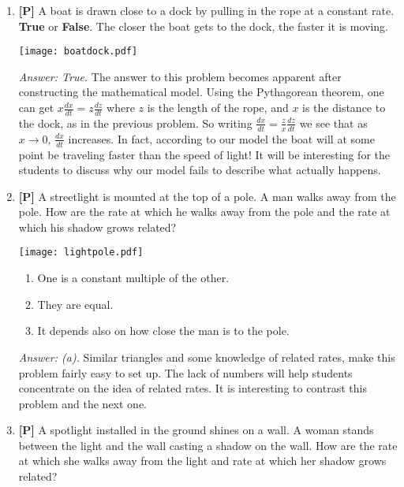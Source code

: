 \documentclass[12pt]{article}
\begin{document}
\begin{enumerate}
Note that answer (a) is correct in the case the boat is pulled in
from a floating dock.

\bigskip

\item {\bf [P]}
A boat is drawn close to a dock by pulling in the rope at a
constant rate.  {\bf True} or {\bf False}. The closer the boat
gets to the dock, the faster it is moving.

\begin{center}
\texttt{[image: boatdock.pdf]}
\end{center}

{\it Answer: True.} The answer to this problem becomes apparent
after constructing the mathematical model. Using the Pythagorean
theorem, one can get $x\frac{dx}{dt}=z\frac{dz}{dt}$ where $z$ 
is the length of the
rope, and $x$ is the distance to the dock, as in the previous problem. So writing
$\frac{dx}{dt}=\frac{z}{x}\frac{dz}{dt}$ 
we see that as $x \rightarrow 0$, $\frac{dx}{dt}$
increases. In fact, according to our model the boat will at some
point be traveling faster than the speed of light! It will be
interesting for the students to discuss why our model fails to
describe what actually happens. 

\bigskip

\item {\bf [P]}
A streetlight is mounted at the top of a pole.  A man walks away from
the pole. How are the rate at which he walks away from the pole
and the rate at which his shadow grows related?

\begin{center}
\texttt{[image: lightpole.pdf]}
\end{center}

\begin{enumerate}
\renewcommand{\theenumii}{\alph{enumii}}
\item One is a constant multiple of the other.
\item They are equal.
\item It depends also on how close the man is to the pole.
\end{enumerate}

{\it Answer: (a).} Similar triangles and some knowledge of
related rates, make this problem fairly easy to set up. The lack
of numbers will help students concentrate on the idea of related
rates. It is interesting to contrast this problem and the next
one.

\bigskip

\item {\bf [P]}
A spotlight installed in the ground shines on a wall.  A woman stands
between the light and the wall casting a shadow on the wall.  How
are the rate at which she walks away from the light and rate at
which her shadow grows related?


\end{enumerate}
\end{document}
